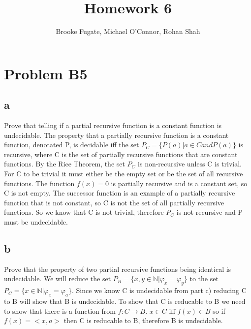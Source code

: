 \documentclass[12pt]{article}
\begin{document}
\pagestyle{plain}
\titleformat{\subsection}[runin]
  {\normalfont\large\bfseries}{\thesubsection}{1em}{}
\titleformat{\subsubsection}[runin]
  {\bfseries}{}{1em}{}

\title{Homework 6}
\author{Brooke Fugate, Michael O'Connor, Rohan Shah}
\date{}

\maketitle

\section*{Problem B5}
\subsection*{a}
Prove that telling if a partial recursive function is a constant function is undecidable.  The property that a partially recursive function is a constant function, denotated P, is decidable iff the set $P_C = \{P(a)|a \in C and P(a)\}$ is recursive, where C is the set of partially recursive functions that are constant functions. By the Rice Theorem, the set $P_C$ is non-recursive unless C is trivial.  For C to be trivial it must either be the empty set or be the set of all recursive functions. The function $f(x)=0$ is partially recursive and is a constant set, so C is not empty.  The successor function is an example of a partially recursive function that is not constant, so C is not the set of all partially recursive functions.  So we know that C is not trivial, therefore $P_C$ is not recursive and P must be undecidable. 
\subsection*{b} 
Prove that the property of two partial recursive functions being identical is undecidable.  We will reduce the set $P_B = \{x,y \in \mathbb{N} | \varphi_x = \varphi_y\}$ to the set $P_C = \{x \in \mathbb{N} | \varphi_x = \varphi_a \}$.  Since we know C is undecidable from part c) reducing C to B will show that B is undecidable. To show that C is reducable to B  we need to show that there is a function from $f : C \rightarrow B$.  $x \in C \text{ iff } f(x) \in B$ so if $f(x) = < x , a >$ then C is reducable to B, therefore B is undecidable.
\end{document}
